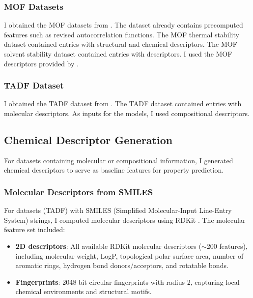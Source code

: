 \documentclass[11pt, oneside]{article}
\begin{document}
\subsubsection{MOF Datasets}
I obtained the MOF datasets from \textcite{Nandy2022}. The dataset already contains precomputed features such as revised autocorrelation functions.\autocite{Moosavi2020} 
The MOF thermal stability dataset contained  entries with  structural and chemical descriptors. 
The MOF solvent stability dataset contained  entries with  descriptors.
I used the MOF descriptors provided by \textcite{Nandy2022}. 

\subsubsection{TADF Dataset}
I obtained the TADF dataset from \textcite{Huang2024}. 
The TADF dataset contained  entries with  molecular descriptors. As inputs for the models, I used compositional descriptors.

\subsection{Chemical Descriptor Generation}

For datasets containing molecular or compositional information, I generated chemical descriptors to serve as baseline features for property prediction. 

\subsubsection{Molecular Descriptors from SMILES}
For datasets (TADF) with SMILES (Simplified Molecular-Input Line-Entry System) strings,\autocite{Weininger1988} I computed molecular descriptors using RDKit \autocite{rdkit}. The molecular feature set included:

\begin{itemize}
    \item \textbf{2D descriptors}: All available RDKit molecular descriptors ($\sim$200 features), including molecular weight, LogP, topological polar surface area, number of aromatic rings, hydrogen bond donors/acceptors, and rotatable bonds.
    \item \textbf{Fingerprints}: 2048-bit circular fingerprints with radius 2, capturing local chemical environments and structural motifs.
\end{itemize}
\end{document}
